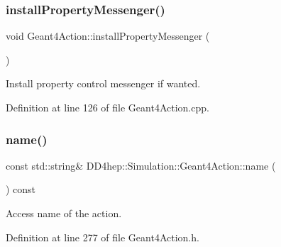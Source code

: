 \hypertarget{class_d_d4hep_1_1_simulation_1_1_geant4_action_a04fb6b6b16ed0aad5f552e04d99d278f}{}\label{class_d_d4hep_1_1_simulation_1_1_geant4_action_a04fb6b6b16ed0aad5f552e04d99d278f} 
\subsubsection{\texorpdfstring{install\+Property\+Messenger()}{installPropertyMessenger()}}
{\footnotesize\ttfamily void Geant4\+Action\+::install\+Property\+Messenger (\begin{DoxyParamCaption}{ }\end{DoxyParamCaption})\hspace{0.3cm}{\ttfamily [virtual]}}



Install property control messenger if wanted. 



Definition at line 126 of file Geant4\+Action.\+cpp.

\hypertarget{class_d_d4hep_1_1_simulation_1_1_geant4_action_af374e70b014d16afb81dd9d77cc3894b}{}\label{class_d_d4hep_1_1_simulation_1_1_geant4_action_af374e70b014d16afb81dd9d77cc3894b} 
\subsubsection{\texorpdfstring{name()}{name()}}
{\footnotesize\ttfamily const std\+::string\& D\+D4hep\+::\+Simulation\+::\+Geant4\+Action\+::name (\begin{DoxyParamCaption}{ }\end{DoxyParamCaption}) const\hspace{0.3cm}{\ttfamily [inline]}}



Access name of the action. 



Definition at line 277 of file Geant4\+Action.\+h.



